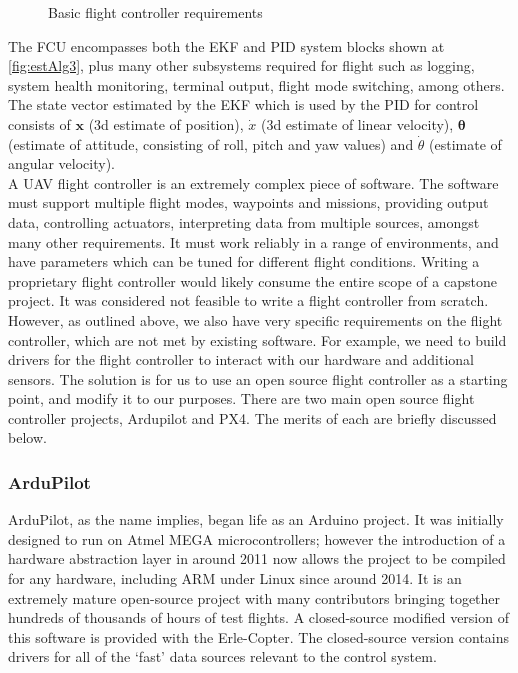 \documentclass[capstone_report.tex]{subfiles}
\begin{document}
\begin{figure}[H]
	\centering
	   	
	   	\caption{Basic flight controller requirements\label{fig:FCU}}
\end{figure}

The FCU encompasses both the EKF and PID system blocks shown at \ref{fig:estAlg3}, plus many other subsystems required for flight such as logging, system health monitoring, terminal output, flight mode switching, among others. The state vector estimated by the EKF which is used by the PID for control consists of $\bm{x}$ (3d estimate of position), $\dot{x}$ (3d estimate of linear velocity), $\bm{\theta}$ (estimate of attitude, consisting of roll, pitch and yaw values) and $\dot{\theta}$ (estimate of angular velocity). \\

A UAV flight controller is an extremely complex piece of software. The software must support multiple flight modes, waypoints and missions, providing output data, controlling actuators, interpreting data from multiple sources, amongst many other requirements. It must work reliably in a range of environments, and have parameters which can be tuned for different flight conditions. Writing a proprietary flight controller would likely consume the entire scope of a capstone project. It was considered not feasible to write a flight controller from scratch. \\

However, as outlined above, we also have very specific requirements on the flight controller, which are not met by existing software. For example, we need to build drivers for the flight controller to interact with our hardware and additional sensors. The solution is for us to use an open source flight controller as a starting point, and modify it to our purposes. There are two main open source flight controller projects, Ardupilot and PX4. The merits of each are briefly discussed below.

\subsubsection{ArduPilot}
ArduPilot, as the name implies, began life as an Arduino project\cite{arduhistory}. It was initially designed to run on Atmel MEGA microcontrollers; however the introduction of a hardware abstraction layer in around 2011 now allows the project to be compiled for any hardware, including ARM under Linux since around 2014. It is an extremely mature open-source project with many contributors bringing together hundreds of thousands of hours of test flights. A closed-source modified version of this software is provided with the Erle-Copter. The closed-source version contains drivers for all of the `fast' data sources relevant to the control system. \\
\end{document}
